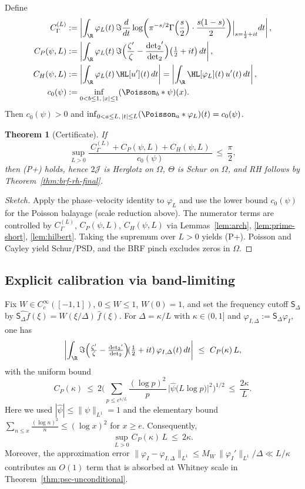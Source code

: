 \documentclass[11pt]{article}
\newtheorem{theorem}{Theorem}
\theoremstyle{remark}
\DeclareMathOperator{\dettwo}{det_2}
\begin{document}
Define
\begin{align*}
 C_\Gamma^{(L)} &:= \left|\int_\R \varphi_L(t)\,\Im\frac{d}{dt}\log\!\left(\pi^{-s/2}\Gamma\!\left(\frac{s}{2}\right)\cdot\frac{s(1-s)}{2}\right)\!\Big|_{s=\frac12+it} dt\right|,\\
 C_P(\psi,L) &:= \left|\int_\R \varphi_L(t)\,\Im\Big(\frac{\zeta'}{\zeta}-\frac{\dettwo'}{\dettwo}\Big)\!\left(\tfrac12+it\right) dt\right|,\\
 C_H(\psi,L) &:= \left|\int_\R \varphi_L(t)\,\HL[u'](t)\,dt\right|=\left|\int_\R \HL[\varphi_L](t)\,u'(t)\,dt\right|,\\
 c_0(\psi) &:= \inf_{0<b\le 1,\,|x|\le 1} (\Poisson_b*\psi)(x).
\end{align*}
Then $c_0(\psi)>0$ and $\inf_{0<a\le L,\,|t|\le L}(\Poisson_a*\varphi_L)(t)=c_0(\psi)$.

\begin{theorem}[Certificate]\label{thm:certificate}
If
\[ \sup_{L>0} \frac{\ C_\Gamma^{(L)} + C_P(\psi,L) + C_H(\psi,L)\ }{\ c_0(\psi)\ }\ \le\ \frac{\pi}{2}, \]
then (P+) holds, hence $2\mathcal J$ is Herglotz on $\Omega$, $\Theta$ is Schur on $\Omega$, and RH follows by Theorem~\ref{thm:brf-rh-final}.
\end{theorem}

\begin{proof}[Sketch]
Apply the phase--velocity identity to $\varphi_L$ and use the lower bound $c_0(\psi)$ for the Poisson balayage (scale reduction above). The numerator terms are controlled by $C_\Gamma^{(L)}$, $C_P(\psi,L)$, $C_H(\psi,L)$ via Lemmas~\ref{lem:arch}, \ref{lem:prime-short}, \ref{lem:hilbert}. Taking the supremum over $L>0$ yields (P+). Poisson and Cayley yield Schur/PSD, and the BRF pinch excludes zeros in $\Omega$.
\end{proof}

\subsection{Explicit calibration via band-limiting}\label{subsec:explicit-calibration}
Fix $W\in C_c^\infty([-1,1])$, $0\le W\le 1$, $W(0)=1$, and set the frequency cutoff $\mathsf S_\Delta$ by $\widehat{\mathsf S_\Delta f}(\xi)=W(\xi/\Delta)\,\widehat f(\xi)$. For $\Delta=\kappa/L$ with $\kappa\in(0,1]$ and $\varphi_{I,\Delta}:=\mathsf S_\Delta\varphi_I$, one has
\[
 \left|\int_\R \Im\Big(\tfrac{\zeta'}{\zeta}-\tfrac{\dettwo'}{\dettwo}\Big)\!(\tfrac12+it)\,\varphi_{I,\Delta}(t)\,dt\right|
 \ \le\ C_P(\kappa)\,L,
\]
with the uniform bound
\[
 C_P(\kappa)\ \le\ 2\Bigg(\sum_{p\le e^{\kappa/L}} \frac{(\log p)^2}{p}\,\big|\widehat\psi\big(L\log p\big)\big|^2\Bigg)^{1/2}
 \ \le\ \frac{2\kappa}{L}.
\]
Here we used $|\widehat\psi|\le \|\psi\|_{L^1}=1$ and the elementary bound $\sum_{n\le x}\frac{(\log n)^2}{n}\le (\log x)^2$ for $x\ge e$. Consequently,
\[
 \sup_{L>0} C_P(\kappa)\,L\ \le\ 2\kappa.
\]
Moreover, the approximation error $\|\varphi_I-\varphi_{I,\Delta}\|_{L^1}\le M_W\,\|\varphi_I'\|_{L^1}/\Delta\ll L/\kappa$ contributes an $O(1)$ term that is absorbed at Whitney scale in Theorem~\ref{thm:psc-unconditional}.
\end{document}
